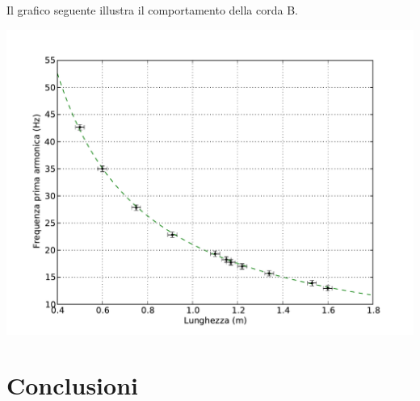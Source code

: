 Il grafico seguente illustra il comportamento della corda B.

\includegraphics[scale=0.75]{"../grafici/CordaPrimaArmonica"}


\section{Conclusioni}

